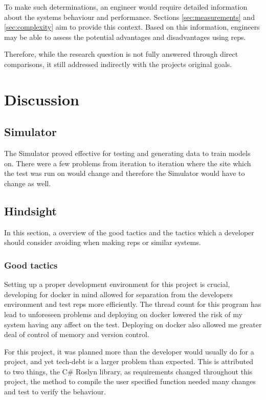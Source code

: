 \documentclass[a4paper,8pt]{article}
\begin{document}
			To make such determinations, an engineer would require detailed information about the systems behaviour and performance. Sections \ref{sec:measurements} and \ref{sec:complexity} aim to provide this context. Based on this information, engineers may be able to assess the potential advantages and disadvantages using \gls{reps}.
			
			Therefore, while the research question is not fully answered through direct comparisons, it still addressed indirectly with the projects original goals.

			
	\section{Discussion}	
	
	\subsection{Simulator}
		The Simulator proved effective for testing and generating data to train models on. There were a few problems from iteration to iteration where the site which the test was run on would change and therefore the Simulator would have to change as well.
		
	\subsection{Hindsight}
	In this section, a overview of the good tactics and the tactics which a developer should consider avoiding when making \gls{reps} or similar systems.
	
	\subsubsection{Good tactics}
		Setting up a proper development environment for this project is crucial, developing for docker in mind allowed for separation from the developers environment and test \gls{reps} more efficiently. The thread count for this program has lead to unforeseen problems and deploying on docker lowered the risk of my system having any affect on the test. Deploying on docker also allowed me greater deal of control of memory and version control.
		
		For this project, it was planned more than the developer would usually do for a project, and yet tech-debt is a larger problem than expected. This is attributed to two things, the C\# Roslyn library, as requirements changed throughout this project, the method to compile the user specified function needed many changes and test to verify the behaviour.
		
\end{document}
